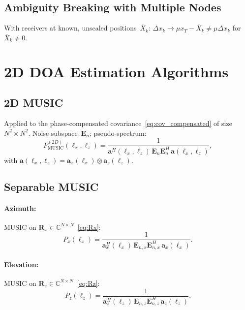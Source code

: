\documentclass[11pt,a4paper]{article}
\newcommand{\C}{\mathbb{C}}
\begin{document}
\subsection{Ambiguity Breaking with Multiple Nodes}
With receivers at known, unscaled positions~$\bar{X}_k$:
$\Delta x_k\to\mu x_T-\bar{X}_k\ne\mu\Delta x_k$ for
$\bar{X}_k\ne 0$.

\section{2D DOA Estimation Algorithms}
\label{sec:doa_algs}

\subsection{2D MUSIC}
\label{sec:music_2d_alg}

Applied to the phase-compensated covariance~\eqref{eq:cov_compensated}
of size $N^2\times N^2$.  Noise subspace~$\mathbf{E}_n$;
pseudo-spectrum:
\begin{equation}
  P_{\mathrm{MUSIC}}^{(2D)}(\ell_x,\ell_z)
  = \frac{1}{\mathbf{a}^H(\ell_x,\ell_z)\,
  \mathbf{E}_n\mathbf{E}_n^H\,\mathbf{a}(\ell_x,\ell_z)},
  \label{eq:music_2d_alg}
\end{equation}
with $\mathbf{a}(\ell_x,\ell_z)=\mathbf{a}_x(\ell_x)\otimes
\mathbf{a}_z(\ell_z)$.

\subsection{Separable MUSIC}
\label{sec:sep_music}

\paragraph{Azimuth:} MUSIC on
$\mathbf{R}_x\in\C^{N\times N}$~\eqref{eq:Rx}:
\begin{equation}
  P_x(\ell_x) = \frac{1}{\mathbf{a}_x^H(\ell_x)\,
  \mathbf{E}_{n,x}\mathbf{E}_{n,x}^H\,\mathbf{a}_x(\ell_x)}.
  \label{eq:music_x}
\end{equation}

\paragraph{Elevation:} MUSIC on
$\mathbf{R}_z\in\C^{N\times N}$~\eqref{eq:Rz}:
\begin{equation}
  P_z(\ell_z) = \frac{1}{\mathbf{a}_z^H(\ell_z)\,
  \mathbf{E}_{n,z}\mathbf{E}_{n,z}^H\,\mathbf{a}_z(\ell_z)}.
  \label{eq:music_z}
\end{equation}
\end{document}
